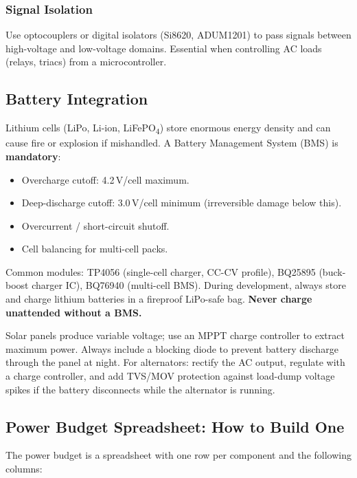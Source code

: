 \documentclass[11pt,letterpaper,twoside,openany]{book}
\begin{document}
\subsubsection{Signal Isolation}
Use optocouplers or digital isolators (Si8620, ADUM1201) to pass signals between high-voltage and low-voltage domains. Essential when controlling AC loads (relays, triacs) from a microcontroller.


\subsection{Battery Integration}
\label{sec:battery}

Lithium cells (LiPo, Li-ion, LiFePO\textsubscript{4}) store enormous energy density and can cause fire or explosion if mishandled. A Battery Management System (BMS) is \textbf{mandatory}:

\begin{itemize}[nosep,leftmargin=1.5em]
  \item Overcharge cutoff: 4.2\,V/cell maximum.
  \item Deep-discharge cutoff: 3.0\,V/cell minimum (irreversible damage below this).
  \item Overcurrent / short-circuit shutoff.
  \item Cell balancing for multi-cell packs.
\end{itemize}

Common modules: TP4056 (single-cell charger, CC-CV profile), BQ25895 (buck-boost charger IC), BQ76940 (multi-cell BMS). During development, always store and charge lithium batteries in a fireproof LiPo-safe bag. \textbf{Never charge unattended without a BMS.}

\begin{tipbox}
Solar panels produce variable voltage; use an MPPT charge controller to extract maximum power. Always include a blocking diode to prevent battery discharge through the panel at night. For alternators: rectify the AC output, regulate with a charge controller, and add TVS/MOV protection against load-dump voltage spikes if the battery disconnects while the alternator is running.
\end{tipbox}



\subsection{Power Budget Spreadsheet: How to Build One}
The power budget is a spreadsheet with one row per component and the following columns:
\end{document}
